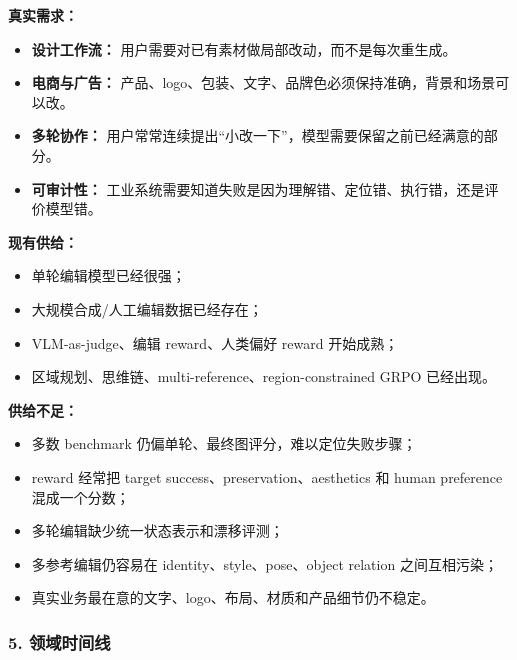 \textbf{真实需求：}

\begin{itemize}[leftmargin=1.5em]
  \item \textbf{设计工作流：} 用户需要对已有素材做局部改动，而不是每次重生成。
  \item \textbf{电商与广告：} 产品、logo、包装、文字、品牌色必须保持准确，背景和场景可以改。
  \item \textbf{多轮协作：} 用户常常连续提出“小改一下”，模型需要保留之前已经满意的部分。
  \item \textbf{可审计性：} 工业系统需要知道失败是因为理解错、定位错、执行错，还是评价模型错。
\end{itemize}

\textbf{现有供给：}

\begin{itemize}[leftmargin=1.5em]
  \item 单轮编辑模型已经很强；
  \item 大规模合成/人工编辑数据已经存在；
  \item VLM-as-judge、编辑 reward、人类偏好 reward 开始成熟；
  \item 区域规划、思维链、multi-reference、region-constrained GRPO 已经出现。
\end{itemize}

\textbf{供给不足：}

\begin{itemize}[leftmargin=1.5em]
  \item 多数 benchmark 仍偏单轮、最终图评分，难以定位失败步骤；
  \item reward 经常把 target success、preservation、aesthetics 和 human preference 混成一个分数；
  \item 多轮编辑缺少统一状态表示和漂移评测；
  \item 多参考编辑仍容易在 identity、style、pose、object relation 之间互相污染；
  \item 真实业务最在意的文字、logo、布局、材质和产品细节仍不稳定。
\end{itemize}

\subsubsection*{5. 领域时间线}

